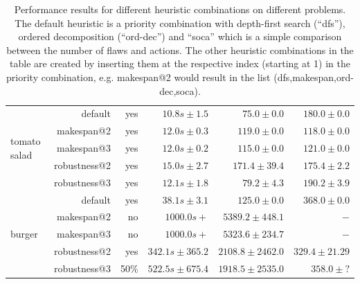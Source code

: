 \begin{table}[]
\begin{tabular}{p{1.5cm}rrrrr}
  \multirow{5}{*}{\parbox{1.5cm}{tomato salad}} 
                                & default                       & yes     & $10.8s\pm1.5 $              & $75.0\pm0.0$                         & $180.0 \pm0.0$               \\
                                & makespan@2                    & yes     & $12.0s\pm0.3 $              & $119.0\pm0.0$                        & $118.0 \pm0.0$               \\
                                & makespan@3                    & yes     & $12.0s\pm0.2 $              & $115.0\pm0.0$                        & $121.0 \pm0.0$               \\
                                & robustness@2                  & yes     & $15.0s\pm2.7 $              & $171.4\pm39.4$                           & $175.4 \pm2.2$               \\
                                & robustness@3                  & yes     & $12.1s\pm1.8 $              & $79.2\pm4.3$                            & $190.2 \pm3.9$               \\\hline
  \multirow{5}{*}{burger}       & default                       & yes     & $38.1s\pm 3.1$              & $125.0\pm0.0$                        & $368.0\pm0.0$                \\
                                & makespan@2                    & no      & $1000.0s+$                  & $5389.2\pm448.1$                     & $-     $                     \\
                                & makespan@3                    & no      & $1000.0s+ $                 & $5323.6\pm234.7$                     & $-     $                     \\
                                & robustness@2                  & yes     & $342.1s\pm365.2 $           & $2108.8\pm2462.0$                    & $329.4 \pm21.29$             \\ 
                                & robustness@3                  & 50\%    & $522.5s\pm675.4 $           & $1918.5\pm2535.0$                    & $358.0 \pm?$                                      
  \end{tabular}
  \caption[Performance results for different heuristic combinations]{Performance results for different heuristic combinations on different problems. The default heuristic is a priority combination with depth-first search (``dfs''), ordered decomposition (``ord-dec'') and ``soca'' which is a simple comparison between the number of flaws and actions. The other heuristic combinations in the table are created by inserting them at the respective index (starting at 1) in the priority combination, e.g. makespan@2 would result in the list (dfs,makespan,ord-dec,soca).}
  \label{tab:eval-heuristics}
\end{table}

